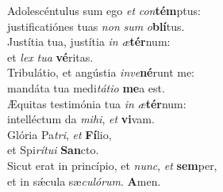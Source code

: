 \oddverse Adolescéntulus sum ego \textit{et} \textit{con}\textbf{tém}ptus:~\*\\
\oddverse justificatiónes tuas \textit{non} \textit{sum} \textit{o}\textbf{blí}tus.\\
\evenverse Justítia tua, justítia \textit{in} \textit{æ}\textbf{tér}num:~\*\\
\evenverse et \textit{lex} \textit{tu}\textit{a} \textbf{vé}ritas.\\
\oddverse Tribulátio, et angústia \textit{in}\textit{ve}\textbf{né}runt me:~\*\\
\oddverse mandáta tua medi\textit{tá}\textit{ti}\textit{o} \textbf{me}a est.\\
\evenverse Æquitas testimónia tua \textit{in} \textit{æ}\textbf{tér}num:~\*\\
\evenverse intelléctum da \textit{mi}\textit{hi}, \textit{et} \textbf{vi}vam.\\
\oddverse Glória Pa\textit{tri}, \textit{et} \textbf{Fí}lio,~\*\\
\oddverse et Spi\textit{rí}\textit{tu}\textit{i} \textbf{San}cto.\\
\evenverse Sicut erat in princípio, et \textit{nunc}, \textit{et} \textbf{sem}per,~\*\\
\evenverse et in sǽcula sæ\textit{cu}\textit{ló}\textit{rum}. \textbf{A}men.\\
